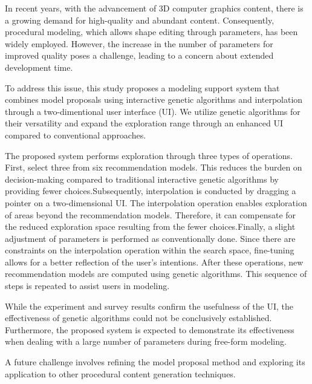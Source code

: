 \newpage

\centerline{}
\vspace{12pt}



In recent years, with the advancement of 3D computer graphics content, there is a growing demand for high-quality and abundant content. Consequently, procedural modeling, which allows shape editing through parameters, has been widely employed. However, the increase in the number of parameters for improved quality poses a challenge, leading to a concern about extended development time. 


To address this issue, this study proposes a modeling support system that combines model proposals using interactive genetic algorithms and interpolation through a two-dimentional user interface (UI). We utilize genetic algorithms for their versatility and expand the exploration range through an enhanced UI compared to conventional approaches. 


The proposed system performs exploration through three types of operations.
First, select three from six recommendation models. This reduces the burden on decision-making compared to traditional interactive genetic algorithms by providing fewer choices.Subsequently, interpolation is conducted by dragging a pointer on a two-dimensional UI. The interpolation operation enables exploration of areas beyond the recommendation models. Therefore, it can compensate for the reduced exploration space resulting from the fewer choices.Finally, a slight adjustment of parameters is performed as conventionally done. Since there are constraints on the interpolation operation within the search space, fine-tuning allows for a better reflection of the user's intentions. After these operations, new recommendation models are computed using genetic algorithms. This sequence of steps is repeated to assist users in modeling.


While the experiment and survey results confirm the usefulness of the UI, the effectiveness of genetic algorithms could not be conclusively established. Furthermore, the proposed system is expected to demonstrate its effectiveness when dealing with a large number of parameters during free-form modeling.


A future challenge involves refining the model proposal method and exploring its application to other procedural content generation techniques.